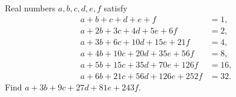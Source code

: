 Real numbers $a,b,c,d,e,f$ satisfy\[\begin{aligned}a+b+c+d+e+f&=1,\\a+2b+3c+4d+5e+6f&=2,\\a+3b+6c+10d+15e+21f&=4,\\a+4b+10c+20d+35e+56f&=8,\\a+5b+15c+35d+70e+126f&=16,\\a+6b+21c+56d+126e+252f&=32.\end{aligned}\]Find $a+3b+9c+27d+81e+243f$.
